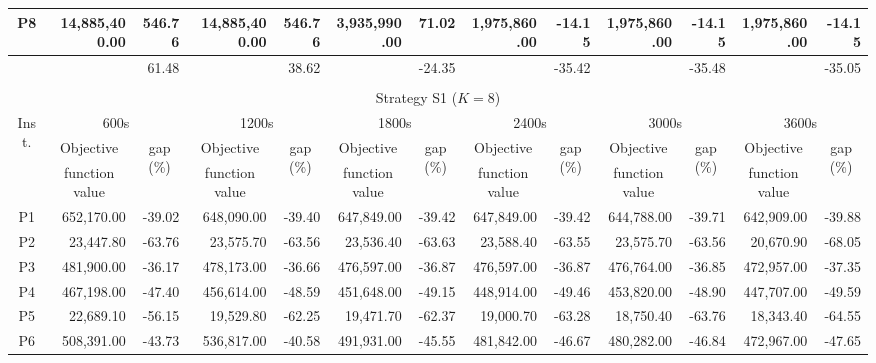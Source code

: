 \documentclass[11pt]{article}
\begin{document}
\begin{table}[ht!]
\begin{center}
{\begin{tabular}{|c|rr|rr|rr|rr|rr|rr|}
P8 & 14,885,400.00 & 546.76 & 14,885,400.00 & 546.76 & 3,935,990.00 & 71.02 & 1,975,860.00 & -14.15 & 1,975,860.00 & -14.15 & 1,975,860.00 & -14.15\\ 
\hline
&  & 61.48 &  & 38.62 &  & -24.35 &  & -35.42 &  & -35.48 &  & -35.05\\
\hline
\multicolumn{13}{c}{}\\
\hline
\multicolumn{13}{|c|}{Strategy S1 ($K = 8$)}\\
\hline
\multirow{3}{*}{Inst.} &  
\multicolumn{2}{c|}{600s} &  
\multicolumn{2}{c|}{1200s} & 
\multicolumn{2}{c|}{1800s} & 
\multicolumn{2}{c|}{2400s} & 
\multicolumn{2}{c|}{3000s} & 
\multicolumn{2}{c|}{3600s}\\ 
\cline{2-13}
& \multicolumn{1}{c}{Objective} & \multicolumn{1}{c|}{\multirow{2}{*}{gap (\%)}} 
& \multicolumn{1}{c}{Objective} & \multicolumn{1}{c|}{\multirow{2}{*}{gap (\%)}} 
& \multicolumn{1}{c}{Objective} & \multicolumn{1}{c|}{\multirow{2}{*}{gap (\%)}} 
& \multicolumn{1}{c}{Objective} & \multicolumn{1}{c|}{\multirow{2}{*}{gap (\%)}} 
& \multicolumn{1}{c}{Objective} & \multicolumn{1}{c|}{\multirow{2}{*}{gap (\%)}} 
& \multicolumn{1}{c}{Objective} & \multicolumn{1}{c|}{\multirow{2}{*}{gap (\%)}} \\
& \multicolumn{1}{c}{function value} &
& \multicolumn{1}{c}{function value} &
& \multicolumn{1}{c}{function value} &
& \multicolumn{1}{c}{function value} &
& \multicolumn{1}{c}{function value} &
& \multicolumn{1}{c}{function value} &\\
\hline
\hline
P1 & 652,170.00 & -39.02 & 648,090.00 & -39.40 & 647,849.00 & -39.42 & 647,849.00 & -39.42 & 644,788.00 & -39.71 & 642,909.00 & -39.88\\
P2  & 23,447.80 & -63.76 & 23,575.70 & -63.56 & 23,536.40 & -63.63 & 23,588.40 & -63.55 & 23,575.70 & -63.56 & 20,670.90 & -68.05\\
P3 & 481,900.00 & -36.17 & 478,173.00 & -36.66 & 476,597.00 & -36.87 & 476,597.00 & -36.87 & 476,764.00 & -36.85 & 472,957.00 & -37.35\\
P4 & 467,198.00 & -47.40 & 456,614.00 & -48.59 & 451,648.00 & -49.15 & 448,914.00 & -49.46 & 453,820.00 & -48.90 & 447,707.00 & -49.59\\
P5 & 22,689.10 & -56.15 & 19,529.80 & -62.25 & 19,471.70 & -62.37 & 19,000.70 & -63.28 & 18,750.40 & -63.76 & 18,343.40 & -64.55\\
P6 & 508,391.00 & -43.73 & 536,817.00 & -40.58 & 491,931.00 & -45.55 & 481,842.00 & -46.67 & 480,282.00 & -46.84 & 472,967.00 & -47.65\\

\end{tabular}}
\end{center}
\end{table}
\end{document}
